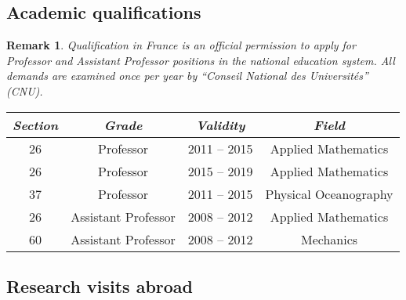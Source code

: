 \documentclass[final, a4paper, oneside, 12pt]{article}
\numberwithin{equation}{section}
\newtheorem{remark}{Remark}
\begin{document}

\subsection{Academic qualifications}

\begin{remark}
Qualification in France is an official permission to apply for Professor and Assistant Professor positions in the national education system. All demands are examined once per year by ``Conseil National des Universit\'es'' (CNU).
\end{remark}

\begin{tabular}{cccc}
  \hline
  \textsl{Section} & \textsl{Grade} & \textsl{Validity} & \textsl{Field} \\
  \hline
  26 &  Professor & 2011 -- 2015 & Applied Mathematics \\
  26 &  Professor & 2015 -- 2019 & Applied Mathematics \\
  37 &  Professor & 2011 -- 2015 & Physical Oceanography \\
  \hline
  26 & Assistant Professor & 2008 -- 2012 & Applied Mathematics \\
  60 & Assistant Professor & 2008 -- 2012 & Mechanics \\
  \hline
\end{tabular}


\subsection{Research visits abroad}
\end{document}
